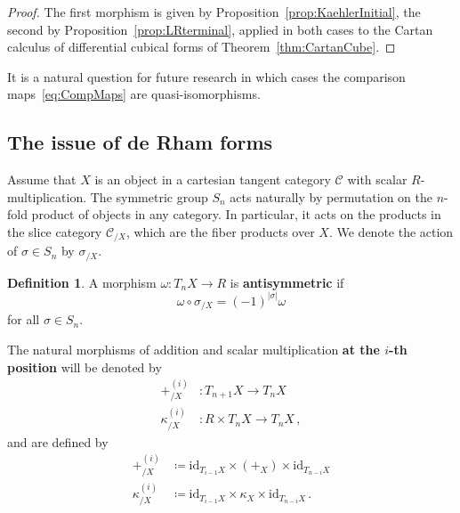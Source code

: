 \documentclass[12pt,reqno, a4paper]{amsart}
\numberwithin{equation}{section}
\theoremstyle{plain}
\theoremstyle{definition}
\newtheorem{Definition}[Theorem]{Definition}
\theoremstyle{remark}
\newcommand{\calC}{\mathcal{C}}
\newcommand{\id}{\mathrm{id}}
\begin{document}
\begin{proof}
The first morphism is given by Proposition~\ref{prop:KaehlerInitial}, the second by Proposition~\ref{prop:LRterminal}, applied in both cases to the Cartan calculus of differential cubical forms of Theorem~\ref{thm:CartanCube}.
\end{proof}

It is a natural question for future research in which cases the comparison maps~\eqref{eq:CompMaps} are quasi-isomorphisms.



\subsection{The issue of de Rham forms}
\label{sec:DeRhamForms}

Assume that $X$ is an object in a cartesian tangent category $\calC$ with scalar $R$-multiplication. The symmetric group $S_n$ acts naturally by permutation on the $n$-fold product of objects in any category. In particular, it acts on the products in the slice category $\calC_{/X}$, which are the fiber products over $X$. We denote the action of $\sigma \in S_n$ by $\sigma_{/X}$.

\begin{Definition}
A morphism $\omega\colon T_n X \to R$ is \textbf{antisymmetric} if
\begin{equation*}
  \omega \circ \sigma_{/X} = (-1)^{|\sigma|} \omega
\end{equation*}
for all $\sigma \in S_n$.
\end{Definition}

The natural morphisms of addition and scalar multiplication \textbf{at the $i$-th position} will be denoted by
\begin{align*}
  +^{(i)}_{/X}
  &\colon
  T_{n+1} X \longrightarrow T_n X
  \\
  \kappa^{(i)}_{/X}
  &\colon
  R \times T_n X \longrightarrow T_n X
  \,,
\end{align*}
and are defined by
\begin{align}
  \label{eq:TfibaddAti}
  +^{(i)}_{/X}
  &\coloneqq
  \id_{T_{i-1}X} \times (+_X) \times \id_{T_{n-i}X}
  \\
  \label{eq:RfibmultAti}
  \kappa^{(i)}_{/X}
  &\coloneqq
  \id_{T_{i-1}X} \times \kappa_X \times \id_{T_{n-i}X}
  \,.
\end{align}
\end{document}
